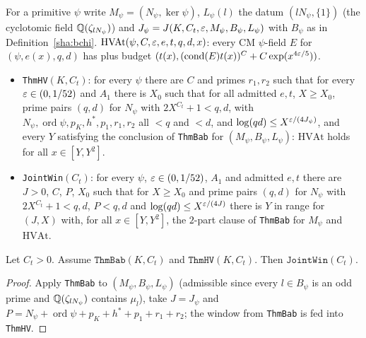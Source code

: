 \begin{definition}\label{sha:jointwin}
For a primitive $\psi$ write $M_{\psi}=(N_{\psi},\ker\psi)$, $L_{\psi}(l)$ the datum
$(lN_{\psi},\{1\})$ (the cyclotomic field $\mathbb{Q}(\zeta_{lN_{\psi}})$) and
$J_{\psi}=J(K,C_t,\varepsilon,M_{\psi},B_{\psi},L_{\psi})$ with $B_{\psi}$ as in Definition~\ref{sha:bchi}.
$\mathrm{HVAt}(\psi,C,\varepsilon,e,t,q,d,x)$: every CM $\psi$-field $E$ for $(\psi,e(x),q,d)$ has
plus budget $(t(x),(\operatorname{cond}(E)t(x))^C+C\exp(x^{4\varepsilon/5}))$.
\begin{itemize}
\item \texttt{ThmHV}$(K,C_t)$: for every $\psi$ there are $C$ and primes $r_1,r_2$ such
that for every $\varepsilon\in(0,1/52)$ and $A_1$ there is $X_0$ such that for all admitted
$e,t$, $X\ge X_0$, prime pairs $(q,d)$ for $N_{\psi}$ with $2X^{C_t}+1<q,d$, with
$N_{\psi},\operatorname{ord}\psi,p_K,h^*,p_1,r_1,r_2$ all $<q$ and $<d$, and
$\log(qd)\le X^{\varepsilon/(4J_{\psi})}$, and every $Y$ satisfying the conclusion of
\texttt{ThmBab} for $(M_{\psi},B_{\psi},L_{\psi})$: $\mathrm{HVAt}$ holds for all $x\in[Y,Y^2]$.
\item \texttt{JointWin}$(C_t)$: for every $\psi$, $\varepsilon\in(0,1/52)$, $A_1$ and admitted
$e,t$ there are $J>0$, $C$, $P$, $X_0$ such that for $X\ge X_0$ and prime pairs
$(q,d)$ for $N_{\psi}$ with $2X^{C_t}+1<q,d$, $P<q,d$ and $\log(qd)\le X^{\varepsilon/(4J)}$ there
is $Y$ in range for $(J,X)$ with, for all $x\in[Y,Y^2]$, the $2$-part clause of
\texttt{ThmBab} for $M_{\psi}$ and $\mathrm{HVAt}$.
\end{itemize}
\end{definition}

\begin{lemma}\label{sha:jointwin-of}
Let $C_t>0$. Assume $\texttt{ThmBab}(K,C_t)$ and $\texttt{ThmHV}(K,C_t)$. Then
$\texttt{JointWin}(C_t)$.
\end{lemma}
\begin{proof}
Apply \texttt{ThmBab} to $(M_{\psi},B_{\psi},L_{\psi})$ (admissible since every $l\in B_{\psi}$ is
an odd prime and $\mathbb{Q}(\zeta_{lN_{\psi}})$ contains $\mu_l$), take $J=J_{\psi}$ and
$P=N_{\psi}+\operatorname{ord}\psi+p_K+h^*+p_1+r_1+r_2$; the window from \texttt{ThmBab} is
fed into \texttt{ThmHV}.
\end{proof}

